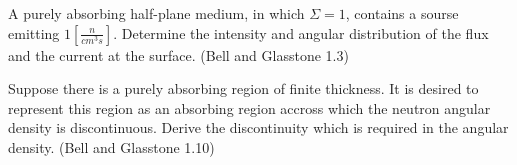 \documentclass[12pts,answers,addpoints]{exam}
\begin{document}
\begin{questions}
        \question[20] A purely absorbing half-plane medium, in which $\Sigma = 1$,
        contains a sourse emitting $1\left[\frac{n}{cm^3s}\right]$. Determine
                the intensity and angular distribution of the flux and the
                current at the surface. (Bell and Glasstone 1.3)

        \question[20] Suppose there is a purely absorbing region of finite
        thickness. It is desired to represent this region as an absorbing
        region accross which the neutron angular density is discontinuous.
        Derive the discontinuity which is required in the angular density.
        (Bell and Glasstone 1.10)

\end{questions}



%
%
\end{document}
